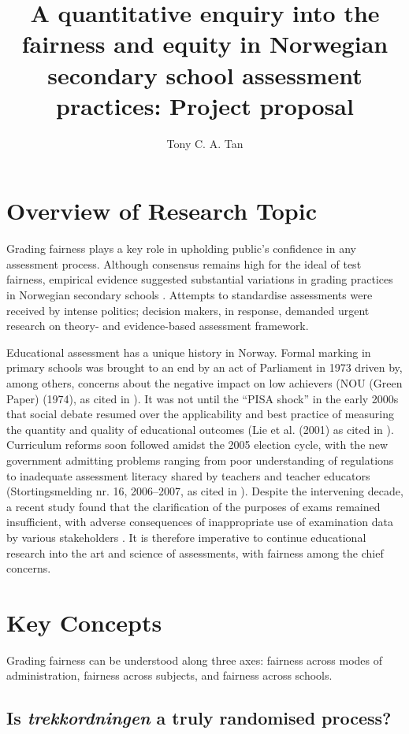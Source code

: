 \documentclass[
    a4paper,            %
    12pt,               %
    stu,                %
    donotrepeattitle,   %
    noextraspace,       %
    floatsintext,       %
    biblatex,           %
    colorlinks=true,        %
    linkcolor=red,          %
    anchorcolor=black,      %
    citecolor=blue,         %
    urlcolor=blue,          %
    bookmarks=true,         %
    bookmarksopen=false,    %
    bookmarksnumbered=true  %
]{apa7}
\title{A quantitative enquiry into the fairness and equity in Norwegian secondary school assessment practices: Project proposal}
\author{Tony C. A. Tan}
\affiliation{Centre for Educational Measurement, University of Oslo}
\begin{document}
\maketitle
\setcounter{page}{1}
\section{Overview of Research Topic}

Grading fairness plays a key role in upholding public's confidence in any assessment process. Although consensus remains high for the ideal of test fairness, empirical evidence suggested substantial variations in grading practices in Norwegian secondary schools \parencite{tveit:2014}. Attempts to standardise assessments were received by intense politics; decision makers, in response, demanded urgent research on theory- and evidence-based assessment framework.

Educational assessment has a unique history in Norway. Formal marking in primary schools was brought to an end by an act of Parliament in 1973 driven by, among others, concerns about the negative impact on low achievers (NOU (Green Paper) (1974), as cited in \textcite{tveit:2014}). It was not until the ``PISA shock'' in the early 2000s that social debate resumed over the applicability and best practice of measuring the quantity and quality of educational outcomes (Lie et al. (2001) as cited in \textcite{tveit:2014}). Curriculum reforms soon followed amidst the 2005 election cycle, with the new government admitting problems ranging from poor understanding of regulations to inadequate assessment literacy shared by teachers and teacher educators (Stortingsmelding nr. 16, 2006--2007, as cited in \textcite{tveit:2014}). Despite the intervening decade, a recent study found that the clarification of the purposes of exams remained insufficient, with adverse consequences of inappropriate use of examination data by various stakeholders \parencite{tveit:2018}. It is therefore imperative to continue educational research into the art and science of assessments, with fairness among the chief concerns.

\section{Key Concepts}

Grading fairness can be understood along three axes: fairness across modes of administration, fairness across subjects, and fairness across schools.

\subsection{Is \textit{trekkordningen} a truly randomised process?}
\end{document}
